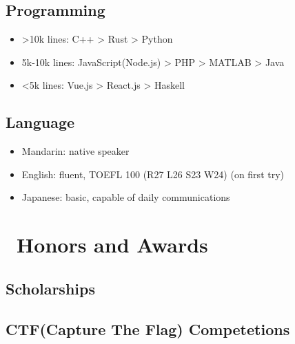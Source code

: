 \documentclass{resume}
\begin{document}
\subsection{Programming}
\begin{itemize}[parsep=0.5ex]
  \item >10k lines: C++ > Rust > Python
  \item 5k-10k lines: JavaScript(Node.js) > PHP > MATLAB > Java
  \item <5k lines: Vue.js > React.js > Haskell
\end{itemize}
\subsection{Language}
\begin{itemize}[parsep=0.5ex]
  \item Mandarin: native speaker
  \item English: fluent, TOEFL 100 (R27 L26 S23 W24) (on first try)
  \item Japanese: basic, capable of daily communications
\end{itemize}

\section{\faHeartO\ Honors and Awards}
\subsection{Scholarships}

\subsection{CTF(Capture The Flag) Competetions}
\end{document}
